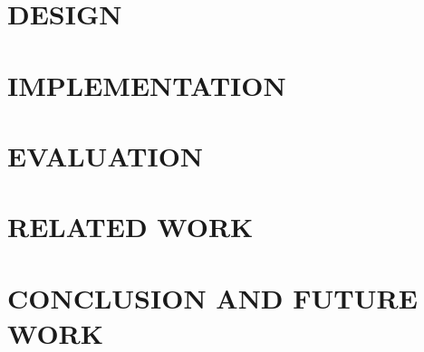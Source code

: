 \documentclass[10pt, conference, letterpaper]{IEEEtran}
\begin{document}
\section{DESIGN}


\section{IMPLEMENTATION}


\section{EVALUATION}


\section{RELATED WORK}


\section{CONCLUSION AND FUTURE WORK}


%


%
%
\end{document}

